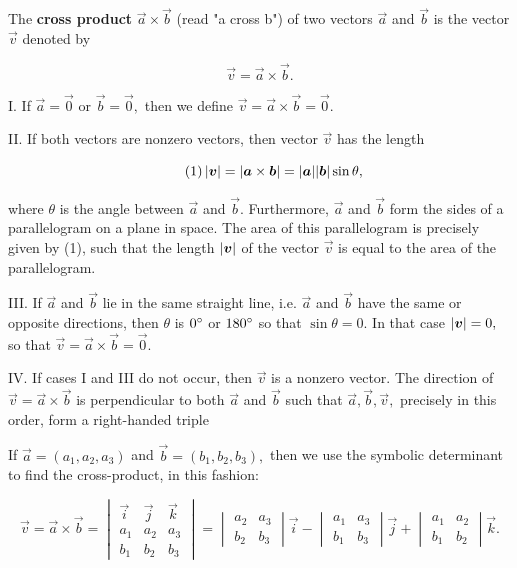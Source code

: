 \documentclass{article}
\begin{document}
\begin{definition}
The \textbf{cross product} $\vec{a} \times \vec{b}$ (read "a cross b") of two \@{vectors} $\vec{a}$ and $\vec{b}$ is the \@{vector} $\vec{v}$ denoted by

\[ \vec{v} = \vec{a} \times \vec{b}. \]

I. If $\vec{a} = \vec{0}$ or $\vec{b} = \vec{0},$ then we define $\vec{v} = \vec{a} \times \vec{b} = \vec{0}.$

II. If both \@{vectors} are nonzero \@{vectors}, then \@{vector} $\vec{v}$ has the \@{length}

\[ \tag{1} \left| \boldsymbol{v} \right| = \left| \boldsymbol{a} \times \boldsymbol{b} \right| = |\boldsymbol{a}||\boldsymbol{b}|\sin{\theta}, \]

where $\theta$ is the angle between $\vec{a}$ and $\vec{b}.$ Furthermore, $\vec{a}$ and $\vec{b}$ form the sides of a parallelogram on a plane in space. The area of this parallelogram is precisely given by (1), such that the length $\left| \boldsymbol{v} \right|$ of the \@{vector} $\vec{v}$ is equal to the area of the parallelogram.

III. If $\vec{a}$ and $\vec{b}$ lie in the same straight line, i.e. $\vec{a}$ and $\vec{b}$ have the same or opposite \@{directions}, then $\theta$ is $0 ^\circ$ or $180 ^\circ$ so that $\sin \theta = 0.$ In that case $\left| \boldsymbol{v} \right| = 0,$  so that $\vec{v} = \vec{a} \times \vec{b} = \vec{0}.$

IV. If cases I and III do not occur, then $\vec{v}$ is a nonzero vector. The \@{direction} of $\vec{v} = \vec{a} \times \vec{b}$ is \@{perpendicular} to both $\vec{a}$ and $\vec{b}$ such that $\vec{a}, \vec{b}, \vec{v},$ precisely in this order, form a right-handed triple
\end{definition}

\begin{remark}
If $\vec{a} = (a_1, a_2, a_3)$ and $\vec{b} = (b_1, b_2, b_3),$ then we use the symbolic determinant to find the \@{cross-product}, in this fashion:

\[ \vec{v} = \vec{a} \times \vec{b} =  \begin{vmatrix}\vec{i} & \vec{j} & \vec{k}\\a_1 & a_2 & a_3\\b_1 & b_2 & b_3\end{vmatrix} = \begin{vmatrix} a_2 & a_3 \\ b_2 & b_3 \end{vmatrix} \vec{i} - \begin{vmatrix} a_1 & a_3 \\ b_1 & b_3 \end{vmatrix} \vec{j} + \begin{vmatrix} a_1 & a_2 \\ b_1 & b_2 \end{vmatrix} \vec{k}. \]
\end{remark}
\end{document}

